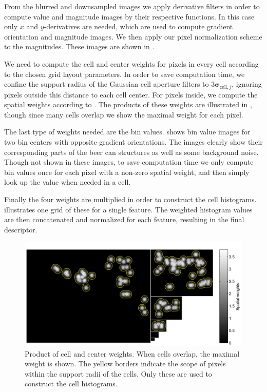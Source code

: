 \documentclass[thesis.tex]{subfiles}
\def\sigmacellj{\boldsymbol{\sigma}_{\text{cell},j}}
\begin{document}
From the blurred and downsampled images we apply derivative filters in order to compute value and magnitude images by their respective functions. In this case only $x$ and $y$-derivatives are needed, which are used to compute gradient orientation and magnitude images. We then apply our pixel normalization scheme to the magnitudes. These images are shown in .

We need to compute the cell and center weights for pixels in every cell according to the chosen grid layout parameters. In order to save computation time, we confine the support radius of the Gaussian cell aperture filters to $3 \sigmacellj$, ignoring pixels outside this distance to each cell center. For pixels inside, we compute the spatial weights according to . The products of these weights are illustrated in , though since many cells overlap we show the maximal weight for each pixel.

The last type of weights needed are the bin values.  shows bin value images for two bin centers with opposite gradient orientations. The images clearly show their corresponding parts of the beer can structures as well as some background noise. Though not shown in these images, to save computation time we only compute bin values once for each pixel with a non-zero spatial weight, and then simply look up the value when needed in a cell.

Finally the four weights are multiplied in order to construct the cell histograms.  illustrates one grid of these for a single feature. The weighted histogram values are then concatenated and normalized for each feature, resulting in the final descriptor.

\begin{figure}[tb]
    \centering
    \includegraphics[width=\textwidth]{img/cellHistScaleSpacesSpatialWeights.pdf}
    \caption{Product of cell and center weights. When cells overlap, the maximal weight is shown. The yellow borders indicate the scope of pixels within the support radii of the cells. Only these are used to construct the cell histograms.}
    \label{fig:cellHistScaleSpacesSpatialWeights}
\end{figure}
\end{document}
